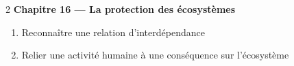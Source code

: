 \begin{multicols}{2}
\textbf{\normalsize\color{onbo}Chapitre 16 --- La protection des écosystèmes}
\begin{enumerate}[label=\arabic*.,itemsep=1pt,topsep=2pt,leftmargin=1.6em]
\item Reconnaître une relation d'interdépendance
\item Relier une activité humaine à une conséquence sur l'écosystème
\end{enumerate}
\vspace{4pt}

\end{multicols}
